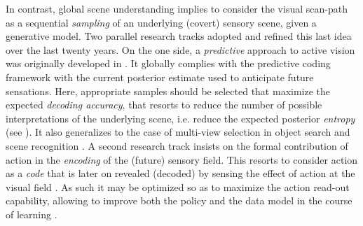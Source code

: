 \documentclass[12pt,twoside,openright]{article}
\begin{document}
In contrast, global scene understanding implies to consider the visual scan-path as a sequential \emph{sampling} of an underlying (covert) sensory scene, given a generative model. 
Two parallel research tracks adopted and refined this last idea over the last twenty years.
On the one side, %
a \emph{predictive} approach to active vision was originally developed in \citep{najemnik2005optimal}.
It globally complies with the predictive coding framework \citep{rao1999predictive} with the current posterior estimate used to anticipate future sensations. 
Here, appropriate samples should be selected that maximize the expected \emph{decoding accuracy}, that resorts to reduce the number of possible interpretations of the underlying scene, i.e. reduce the expected posterior \emph{entropy} (see \citet{najemnik2005optimal,najemnik2009simple,butko2010infomax,friston2012perceptions}).
It also generalizes to the case of multi-view selection in object search and scene recognition \citep{potthast2016active}.
A second research track insists on the formal contribution of action in the \emph{encoding} of the (future) sensory field. This resorts to consider action as a \emph{code} that is later on revealed (decoded) by sensing the effect of action at the visual field \citep{klyubin2005empowerment,tishby2011information}. As such it may be optimized so as to maximize the action read-out capability, allowing to improve both the policy and the data model in the course of learning \citep{schmidhuber2007simple,mohamed2015variational,houthooft2016vime}.
\end{document}
